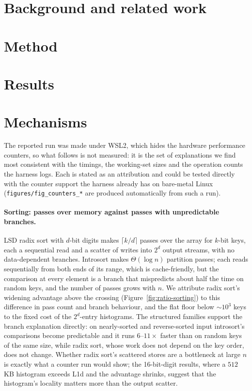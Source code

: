 \documentclass[11pt]{article}
\begin{document}
\section{Background and related work}\label{sec:background}



\section{Method}\label{sec:method}



\section{Results}\label{sec:results}



\section{Mechanisms}\label{sec:mechanisms}

The reported run was made under WSL2, which hides the hardware performance
counters, so what follows is not measured: it is the set of explanations we
find most consistent with the timings, the working-set sizes and the
operation counts the harness logs. Each is stated as an attribution and could
be tested directly with the counter support the harness already has on
bare-metal Linux (\texttt{figures/fig\_counters\_*} are produced automatically
from such a run). 

\paragraph{Sorting: passes over memory against passes with unpredictable
branches.} LSD radix sort with $d$-bit digits makes $\lceil k/d\rceil$ passes
over the array for $k$-bit keys, each a sequential read and a scatter of
writes into $2^d$ output streams, with no data-dependent branches.
Introsort makes $\Theta(\log n)$ partition passes; each reads sequentially
from both ends of its range, which is cache-friendly, but the comparison at
every element is a branch that mispredicts about half the time on random
keys, and the number of passes grows with $n$. We attribute radix sort's
widening advantage above the crossing (Figure~\ref{fig:ratio-sorting}) to
this difference in pass count and branch behaviour, and the flat floor below
$\sim10^3$ keys to the fixed cost of the $2^d$-entry histograms. The
structured families support the branch explanation directly: on
nearly-sorted and reverse-sorted input introsort's comparisons become
predictable and it runs $6$--$11\times$ faster than on random keys of the
same size, while radix sort, whose work does not depend on the key order,
does not change. Whether radix sort's scattered stores are a bottleneck at
large $n$ is exactly what a counter run would show; the 16-bit-digit
results, where a $512$\,KB histogram exceeds L1d and the advantage shrinks,
suggest that the histogram's locality matters more than the output scatter.
\end{document}
